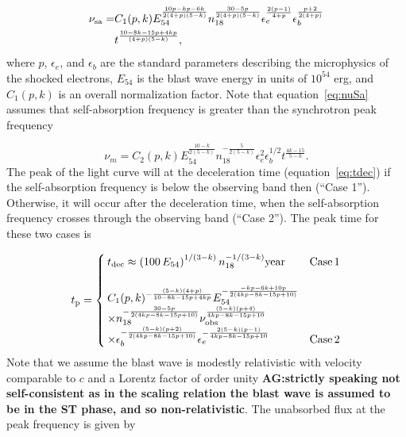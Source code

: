 \documentclass[usenatbib,fleqn]{mnras}
\begin{document}
\begin{align}
  \nu_{\rm sa}=&C_1(p, k) E_{54}^{\frac{10 p-k p -6 k}{2 (4+p) (5-k)}} n_{18}^{\frac{30 - 5 p}{2 (4 + p) (5 - k)}}
  \epsilon_e^{\frac{2 (p-1)}{4+p}} \epsilon_b^{\frac{p+2}{2 (4+p)}}\nonumber\\
  &t^{\frac{10 - 8 k - 15 p + 4 k p}{(4 + p) (5 - k)}}, 
\label{eq:nuSa} 
\end{align}
%
where $p$, $\epsilon_e$, and $\epsilon_b$ are the standard parameters
describing the microphysics of the shocked electrons, $E_{54}$ is the
blast wave energy in units of $10^{54}$ erg, and $C_1(p, k)$ is an
overall normalization factor.  Note that equation~\eqref{eq:nuSa}
assumes that self-absorption frequency is greater than the synchrotron
peak frequency

\begin{equation}
\nu_m=C_2(p, k) E_{54}^{\frac{10-k}{2 (5-k)}} n_{18}^{-\frac{5}{2
    (5-k)}}  \epsilon_e^2  \epsilon_b^{1/2}  t^{\frac{4 k-15}{5-k}}.
\end{equation}
%
The peak of the light curve will at the deceleration time
(equation~\ref{eq:tdec}) if the self-absorption frequency is below the
observing band then (``Case 1''). Otherwise, it will occur after the
deceleration time, when the self-absorption frequency crosses through
the observing band (``Case 2''). The peak time for these two cases is

\begin{align}
t_{\rm p}=
\begin{cases}
  t_{\rm dec}\approx \left(100 \, E_{54}\right)^{1/(3-k)}
  n_{18}^{-1/(3-k)} {\rm year} & {\rm Case\, 1}\\\\
  C_1(p, k)^{-\frac{(5 - k) (4 + p)}{10 - 8 k - 15 p + 4 k
      p}}E_{54}^{-\frac{-k p-6 k+10 p}{2 (4 k p-8 k-15 p+10)}}\\
  \times n_{18}^{-\frac{30-5 p}{2 (4 k p-8 k-15 p+10)}} \nu_{\rm
    obs}^{\frac{(5-k) (p+4)}{4 k p-8 k-15 p+10}}\\
  \times  \epsilon_b^{-\frac{(5-k) (p+2)}{2 (4 k p-8 k-15 p+10)}} \epsilon_e^{-\frac{2 (5-k) (p-1)}{4 k p-8 k-15 p+10}} & {\rm
    Case\, 2}
\end{cases}
\label{eq:tpeakGen}
\end{align}
%
Note that we assume the blast wave is modestly relativistic with
velocity comparable to $c$ and a Lorentz factor of order unity {\bf
  AG:strictly speaking not self-consistent as in the scaling relation
  the blast wave is assumed to be in the ST phase, and so
  non-relativistic}. The unabsorbed flux at the peak frequency is
given by
\end{document}
